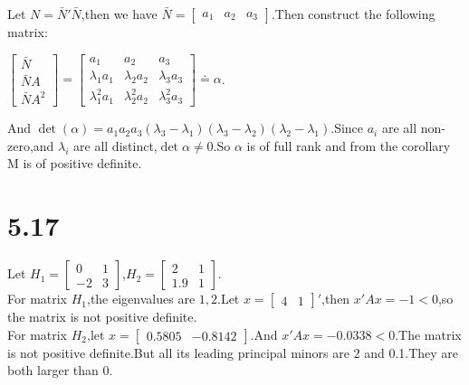 \documentclass{article}
\begin{document}
Let $N=\bar{N}'\bar{N}$,then we have $\bar{N}=\left[\begin{array}{lll} a_1 & a_2 & a_3\end{array}\right]$.Then construct the following matrix:\\
\begin{center}
    $\left[\begin{array}{l}\bar{N}\\ \bar{N}A \\ \bar{N}A^2\end{array}\right]=\left[\begin{array}{lll} a_1 & a_2 & a_3\\ \lambda_1a_1 & \lambda_2a_2 & \lambda_3a_3\\ \lambda^2_1a_1 & \lambda^2_2a_2 & \lambda^2_3a_3\end{array}\right]\doteq \alpha$.
\end{center}

And $\det (\alpha)=a_1a_2a_3(\lambda_3-\lambda_1)(\lambda_3-\lambda_2)(\lambda_2-\lambda_1)$.Since $a_i$ are all non-zero,and $\lambda_i$ are all distinct,$\det \alpha \neq 0$.So $\alpha$ is of full rank and from the corollary M is of positive definite.\\

\section*{5.17}

Let $H_1=\left[\begin{array}{cc}
0 & 1 \\
-2 & 3
\end{array}\right]$,$H_2=\left[\begin{array}{cc}
2 & 1 \\
1.9 & 1
\end{array}\right]$.\\

For matrix $H_1$,the eigenvalues are $1,2$.Let $x=\left[\begin{array}{ll}4 & 1\end{array}\right]'$,then $x'Ax=-1<0$,so the matrix is not positive definite.\\

For matrix $H_2$,let $x=\left[\begin{array}{ll} 0.5805 & -0.8142\end{array}\right]$.And $x'Ax=-0.0338<0$.The matrix is not positive definite.But all its leading principal minors are 2 and 0.1.They are both larger than 0.\\
\end{document}
